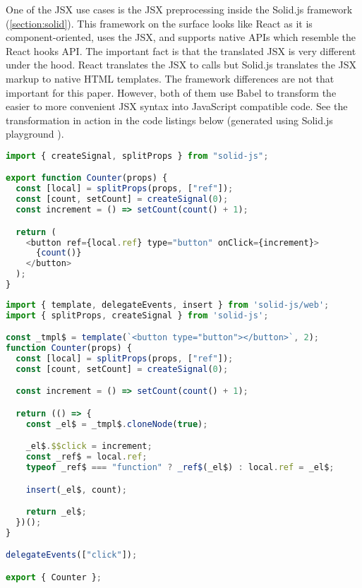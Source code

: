 One of the JSX use cases is the JSX preprocessing inside the Solid.js framework
(\ref{section:solid}). This framework on the surface looks like React as it is component-oriented,
uses the JSX, and supports native APIs which resemble the React hooks API. The important fact is that
the translated JSX is very different under the hood. React translates the JSX to
 calls but Solid.js translates the JSX markup to native HTML templates.
The framework differences are not that important for this paper. However, both of them use Babel to
transform the easier to more convenient JSX syntax into JavaScript compatible code. See the
transformation in action in the code listings below (generated using Solid.js playground
\cite{solidjs_playground}).

\bigskip
\begin{lstlisting}[language=JavaScript, caption=Example of a component in Solid.js using JSX]
import { createSignal, splitProps } from "solid-js";

export function Counter(props) {
  const [local] = splitProps(props, ["ref"]);
  const [count, setCount] = createSignal(0);
  const increment = () => setCount(count() + 1);

  return (
    <button ref={local.ref} type="button" onClick={increment}>
      {count()}
    </button>
  );
}
\end{lstlisting}

\bigskip
\begin{lstlisting}[language=JavaScript, caption=Example of a Solid.js component after Babel transformation]
import { template, delegateEvents, insert } from 'solid-js/web';
import { splitProps, createSignal } from 'solid-js';

const _tmpl$ = template(`<button type="button"></button>`, 2);
function Counter(props) {
  const [local] = splitProps(props, ["ref"]);
  const [count, setCount] = createSignal(0);

  const increment = () => setCount(count() + 1);

  return (() => {
    const _el$ = _tmpl$.cloneNode(true);

    _el$.$$click = increment;
    const _ref$ = local.ref;
    typeof _ref$ === "function" ? _ref$(_el$) : local.ref = _el$;

    insert(_el$, count);

    return _el$;
  })();
}

delegateEvents(["click"]);

export { Counter };
\end{lstlisting}

